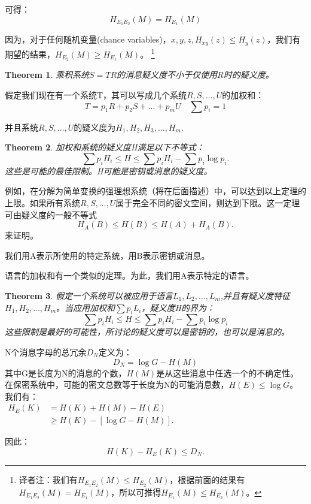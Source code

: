 \documentclass[]{article}
\newtheorem{theorem}{Theorem}
\begin{document}
可得：
\[H_{E_1 E_2}(M)=H_{E_1}(M)\]

因为，对于任何随机变量(chance variables)，$x,y,z,H_{xy}(z)\leq H_y(z)$，我们有期望的结果，$H_{E_2}(M) \geq H_{E_1}(M)$。
\footnote{译者注：我们有$H_{E_1E_2}(M)\leq H_{E_2}(M)$，根据前面的结果有$H_{E_1 E_2}(M)=H_{E_1}(M)$，所以可推得$H_{E_1}(M) \leq H_{E_2}(M)$。}

\begin{theorem}
	乘积系统$S=TR$的消息疑义度不小于仅使用$R$时的疑义度。
\end{theorem}

假定我们现在有一个系统T，其可以写成几个系统$R,S,\ldots,U$的加权和：
\[T=p_1 R+p_2 S+\ldots+p_m U \quad \sum {p_i}=1\]

并且系统$R,S,\ldots,U$的疑义度为$H_1,H_2,H_3,\ldots,H_m$.

\begin{theorem}
	加权和系统的疑义度H满足以下不等式：
	\[\sum {p_i H_i} \leq H \leq \sum {p_i H_i} -\sum {p_i\log{p_i}}.\]
	这些是可能的最佳限制。H可能是密钥或消息的疑义度。
\end{theorem}

例如，在分解为简单变换的强理想系统（将在后面描述）中，可以达到以上定理的上限。如果所有系统$R,S,\ldots,U$属于完全不同的密文空间，则达到下限。这一定理可由疑义度的一般不等式
\[H_A(B)\leq H(B) \leq H(A)+H_A(B).\]
来证明。

我们用A表示所使用的特定系统，用B表示密钥或消息。

语言的加权和有一个类似的定理。为此，我们用A表示特定的语言。

\begin{theorem}
	假定一个系统可以被应用于语言$L_1,L_2,\ldots,L_m$,并且有疑义度特征$H_1,H_2,\ldots,H_m$。当应用加权和$\sum {p_i L_i}$，疑义度H的界为：
	\[\sum {p_i H_i} \leq H \leq \sum {p_i H_i}-\sum {p_i \log{p_i}}\]
	这些限制是最好的可能性，所讨论的疑义度可以是密钥的，也可以是消息的。
\end{theorem}

N个消息字母的总冗余$D_N$定义为：
\[D_N=\log{G} -H(M)\]
其中G是长度为N的消息的个数，$H(M)$是从这些消息中任选一个的不确定性。在保密系统中，可能的密文总数等于长度为N的可能消息数，$H(E)\leq \log{G}$。我们有：\\
$\begin{matrix}
	H_E(K) & =H(K)+H(M)-H(E)\\
	       & \geq H(K)- [\log{G}-H(M)].
\end{matrix}$

因此：
\[H(K)-H_E(K)\leq D_N.\]
\end{document}
